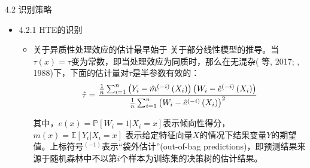 \documentclass{beamer}%
\begin{document}
\begin{frame}[t]{\large 4.2 识别策略}
\begin{itemize}
  \item 4.2.1 HTE的识别
  \begin{itemize}
  \item 关于异质性处理效应的估计最早始于 关于部分线性模型的推导。当$\tau(x)=\tau$变为常数，即当处理效应为同质时，那么在无混杂(  等, 2017;  , 1988)下，下面的估计量对$\tau$是半参数有效的：
  \begin{equation}
  \setlength{\abovedisplayskip}{3.5pt}
  \setlength{\belowdisplayskip}{3.5pt}
     \hat{\tau}=\frac{\frac{1}{n} \sum_{i=1}^n\left(Y_i-\hat{m}^{(-i)}\left(X_i\right)\right)\left(W_i-\hat{e}^{(-i)}\left(X_i\right)\right)}{\frac{1}{n} \sum_{i=1}^n\left(W_i-\hat{e}^{(-i)}\left(X_i\right)\right)^2}
  \end{equation}

  其中，$e(x)=\mathbb{P}\left[W_i=1|X_i=x \right]$表示倾向性得分，$m(x)=\mathbb{E}[Y_i|X_i=x]$ 表示给定特征向量$X$的情况下结果变量$Y$的期望值。上标符号$^{(-1)}$表示“袋外估计”(out-of-bag predictions)，即预测结果来源于随机森林中不以第$i$个样本为训练集的决策树的估计结果。
  \end{itemize}
\end{itemize}
\end{frame}
\end{document}

